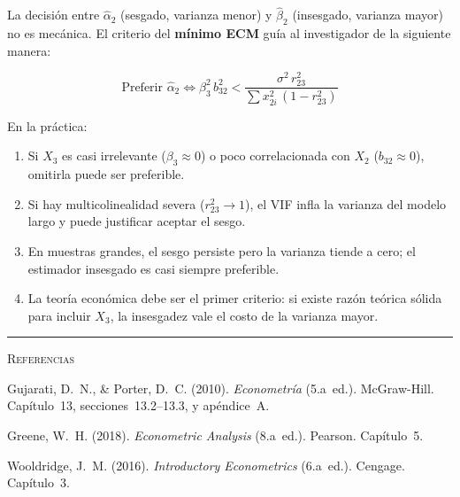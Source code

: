 \documentclass[12pt, letterpaper]{article}
\begin{document}
\begin{clave}
  La decisión entre $\hat{\alpha}_2$ (sesgado, varianza menor) y
  $\hat{\beta}_2$ (insesgado, varianza mayor) no es mecánica. El criterio del
  \textbf{mínimo ECM} guía al investigador de la siguiente manera:

  \begin{equation*}
    \text{Preferir } \hat{\alpha}_2 \iff
    \beta_3^2\,b_{32}^2 <
    \frac{\sigma^2\,r_{23}^2}{\sum x_{2i}^2\,(1-r_{23}^2)}
  \end{equation*}

  En la práctica:
  \begin{enumerate}[leftmargin=1.4em]
    \item Si $X_3$ es casi irrelevante ($\beta_3 \approx 0$) o poco
      correlacionada con $X_2$ ($b_{32} \approx 0$), omitirla puede ser
      preferible.
    \item Si hay multicolinealidad severa ($r_{23}^2 \to 1$), el VIF infla la
      varianza del modelo largo y puede justificar aceptar el sesgo.
    \item En muestras grandes, el sesgo persiste pero la varianza tiende a
      cero; el estimador insesgado es casi siempre preferible.
    \item La teoría económica debe ser el primer criterio: si existe razón
      teórica sólida para incluir $X_3$, la insesgadez vale el costo de la
      varianza mayor.
  \end{enumerate}
\end{clave}

\vspace{14pt}
\noindent\rule{\linewidth}{0.4pt}


\vspace{14pt}

\begin{center}
\small\textsc{Referencias}\\[6pt]
\end{center}

\noindent Gujarati, D.~N., \& Porter, D.~C. (2010). \textit{Econometría}
(5.a~ed.). McGraw-Hill. Capítulo~13, secciones~13.2--13.3, y apéndice~A.

\noindent Greene, W.~H. (2018). \textit{Econometric Analysis} (8.a~ed.).
Pearson. Capítulo~5.

\noindent Wooldridge, J.~M. (2016). \textit{Introductory Econometrics}
(6.a~ed.). Cengage. Capítulo~3.
\end{document}
